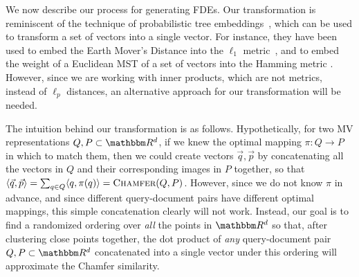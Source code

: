


We now describe our process for generating FDEs.
Our transformation is reminiscent of the technique of probabilistic tree embeddings~\cite{B96, FRT04, AIK08, CJLW22}, which can be used to transform a set of vectors into a single vector. For instance, they have been used to embed the Earth Mover's Distance into the $\ell_1$ metric~\cite{I04b, AIK08, CJLW22,  jayaram2024data}, and to embed the weight of a Euclidean MST of a set of vectors into the Hamming metric \cite{I04b, jayaram2024massively, 10.1145/3564246.3585168}. However, since we are working with inner products, which are not metrics, instead of $\ell_p$ distances, an alternative approach for our transformation will be needed.


 The intuition behind our transformation is as follows. Hypothetically, for two MV representations $Q,P \subset \R^d$, if we knew the optimal mapping $\pi:Q \to P$ in which to match them, then we could create vectors $\vec{q} ,\vec{p}$ by concatenating all the vectors in $Q$ and their corresponding images in $P$ together, so that $\langle \vec{q},\vec{p}\rangle = \sum_{q \in Q} \langle q, \pi(q) \rangle = \textsc{Chamfer}(Q,P)$. However, since we do not know $\pi$ in advance, and since different query-document pairs have different optimal mappings, this simple concatenation clearly will not work. Instead, our goal is to find a randomized ordering over \textit{all} the points in $\R^d$ so that, after clustering close points together, the dot product of \textit{any} query-document pair $Q,P \subset \R^d$ concatenated into a single vector under this ordering will approximate the Chamfer similarity. 

